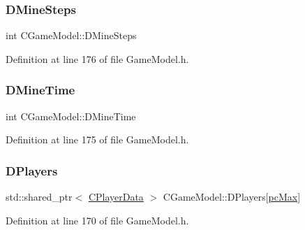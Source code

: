 \hypertarget{classCGameModel_a9f3d8b652f62a0a1b993cb2402800203}{}\label{classCGameModel_a9f3d8b652f62a0a1b993cb2402800203} 
\subsubsection{\texorpdfstring{D\+Mine\+Steps}{DMineSteps}}
{\footnotesize\ttfamily int C\+Game\+Model\+::\+D\+Mine\+Steps\hspace{0.3cm}{\ttfamily [protected]}}



Definition at line 176 of file Game\+Model.\+h.

\hypertarget{classCGameModel_ab7bd9d3b4852d539aa605177ae2f27e8}{}\label{classCGameModel_ab7bd9d3b4852d539aa605177ae2f27e8} 
\subsubsection{\texorpdfstring{D\+Mine\+Time}{DMineTime}}
{\footnotesize\ttfamily int C\+Game\+Model\+::\+D\+Mine\+Time\hspace{0.3cm}{\ttfamily [protected]}}



Definition at line 175 of file Game\+Model.\+h.

\hypertarget{classCGameModel_a524436c3560b10e1c6d6fdd0b66565dc}{}\label{classCGameModel_a524436c3560b10e1c6d6fdd0b66565dc} 
\subsubsection{\texorpdfstring{D\+Players}{DPlayers}}
{\footnotesize\ttfamily std\+::shared\+\_\+ptr$<$ \hyperlink{classCPlayerData}{C\+Player\+Data} $>$ C\+Game\+Model\+::\+D\+Players\mbox{[}\hyperlink{GameDataTypes_8h_aafb0ca75933357ff28a6d7efbdd7602fa594a5c8dd3987f24e8a0f23f1a72cd34}{pc\+Max}\mbox{]}\hspace{0.3cm}{\ttfamily [protected]}}



Definition at line 170 of file Game\+Model.\+h.

\hypertarget{classCGameModel_a3fb9b6b40f397c022087f381f63954b9}{}\label{classCGameModel_a3fb9b6b40f397c022087f381f63954b9} 
